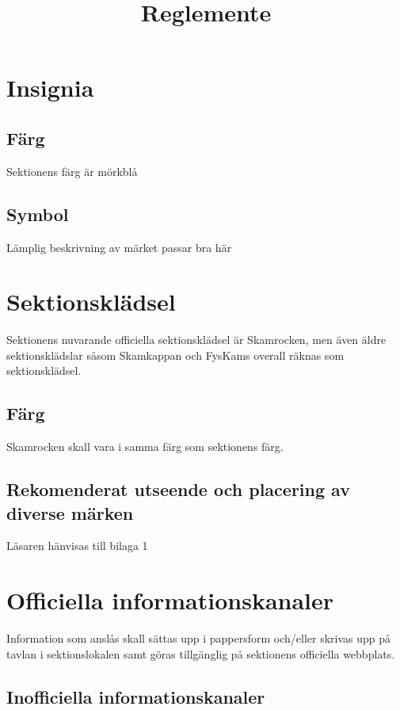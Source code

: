 \documentclass{../resources/dgovdoc}
\title{Reglemente}
\begin{document}
\maketitle

\section{Insignia}

\subsection{Färg}

Sektionens färg är mörkblå

\subsection{Symbol}

Lämplig beskrivning av märket passar bra här

\section{Sektionsklädsel}

Sektionens nuvarande officiella sektionsklädsel är Skamrocken, men även äldre sektionsklädslar såsom Skamkappan och FysKams overall
räknas som sektionsklädsel.

\subsection{Färg}

Skamrocken skall vara i samma färg som sektionens färg.

\subsection{Rekomenderat utseende och placering av diverse märken}

Läsaren hänvisas till bilaga 1

\section{Officiella informationskanaler}

Information som anslås skall sättas upp i pappersform och/eller skrivas upp på tavlan i sektionslokalen samt göras tillgänglig på sektionens officiella webbplats.

\subsection{Inofficiella informationskanaler}
\end{document}
